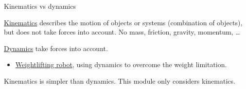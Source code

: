\documentclass[compress]{beamer}
\begin{document}
\begin{frame}{Kinematics vs dynamics}

\href{http://en.wikipedia.org/wiki/Kinematics}{Kinematics} describes the
motion of objects or systems (combination of objects), but does not take
forces into account. No mass, friction, gravity, momentum, \ldots{}

\href{http://en.wikipedia.org/wiki/Analytical_dynamics}{Dynamics} take
forces into account.

\begin{itemize}
    \item \href{http://www.youtube.com/watch?v=kEed8DVO21I}{Weightlifting
  robot}, using dynamics to overcome the weight limitation.
\end{itemize}

Kinematics is simpler than dynamics. This module only considers
kinematics.

\end{frame}
\end{document}
